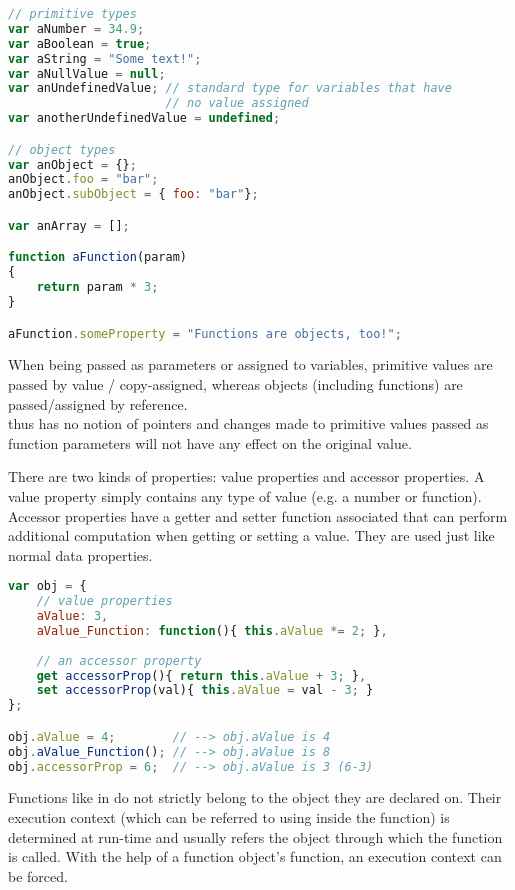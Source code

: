 \SingleSpacing
\begin{lstlisting}[language=JavaScript, caption=Types in \myProperName{JavaScript}]
// primitive types
var aNumber = 34.9;
var aBoolean = true;
var aString = "Some text!";
var aNullValue = null;
var anUndefinedValue; // standard type for variables that have 
                      // no value assigned
var anotherUndefinedValue = undefined;

// object types
var anObject = {};
anObject.foo = "bar";
anObject.subObject = { foo: "bar"};

var anArray = [];

function aFunction(param)
{
	return param * 3;
}

aFunction.someProperty = "Functions are objects, too!";
\end{lstlisting}
\OnehalfSpacing

When being passed as parameters or assigned to variables, primitive values are passed by value / copy-assigned, whereas objects (including functions) are passed/assigned by reference.\\
 thus has no notion of pointers and changes made to primitive values passed as function parameters will not have any effect on the original value.

There are two kinds of properties: value properties and accessor properties. A value property simply contains any type of value (e.g. a number or function). Accessor properties have a getter and setter function associated that can perform additional computation when getting or setting a value. They are used just like normal data properties.

\SingleSpacing
\begin{lstlisting}[language=JavaScript, caption=Types in \myProperName{JavaScript}, label=JSTypes]
var obj = {
	// value properties
	aValue: 3,
	aValue_Function: function(){ this.aValue *= 2; },
	
	// an accessor property
	get accessorProp(){ return this.aValue + 3; },
	set accessorProp(val){ this.aValue = val - 3; }
};

obj.aValue = 4;        // --> obj.aValue is 4
obj.aValue_Function(); // --> obj.aValue is 8
obj.accessorProp = 6;  // --> obj.aValue is 3 (6-3)
\end{lstlisting}
\OnehalfSpacing

Functions like  in  do not strictly belong to the object they are declared on. Their execution context (which can be referred to using  inside the function) is determined at run-time and usually refers the object through which the function is called. With the help of a function object's  function, an execution context can be forced.

